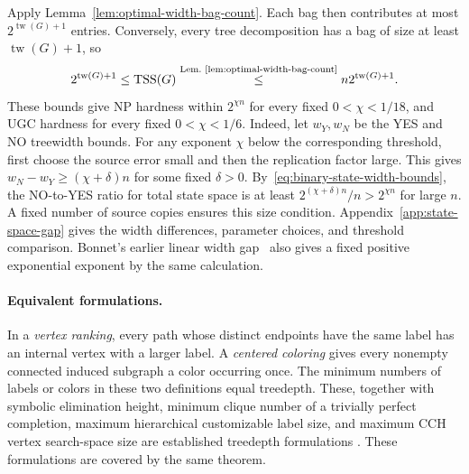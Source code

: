 Apply Lemma~\ref{lem:optimal-width-bag-count}.
Each bag then contributes at most $2^{\operatorname{tw}(G)+1}$ entries.
Conversely, every tree decomposition has a bag of size at least
$\operatorname{tw}(G)+1$, so
\begin{equation}\label{eq:binary-state-width-bounds}
 2^{\operatorname{tw}(G)+1}\leq\operatorname{TSS}(G)
       \overset{\text{Lem.~\ref{lem:optimal-width-bag-count}}}{\leq}n2^{\operatorname{tw}(G)+1}.
\end{equation}
These bounds give
NP hardness within $2^{\chi n}$ for every fixed $0<\chi<1/18$,
and UGC hardness for every fixed $0<\chi<1/6$.
Indeed, let $w_Y,w_N$ be the YES and NO treewidth bounds.
For any exponent $\chi$ below the corresponding threshold, first
choose the source error small and then the replication factor large.
This gives $w_N-w_Y\ge(\chi+\delta)n$ for some fixed $\delta>0$.
By~\eqref{eq:binary-state-width-bounds}, the NO-to-YES ratio for total
state space is at least $2^{(\chi+\delta)n}/n>2^{\chi n}$ for large
$n$. A fixed number of source copies ensures this size condition.
Appendix~\ref{app:state-space-gap} gives the width differences,
parameter choices, and threshold comparison.
Bonnet's earlier linear width gap~\cite{BonnetTreewidth} also gives
a fixed positive exponential exponent by the same calculation.

\paragraph{Equivalent formulations.}
In a \emph{vertex ranking}, every path whose distinct endpoints
have the same label has an internal vertex with a larger label.
A \emph{centered coloring} gives every nonempty connected induced
subgraph a color occurring once. The minimum numbers of
labels or colors in these two definitions equal treedepth.
These, together with symbolic elimination height,
minimum clique number of a trivially perfect completion, maximum
hierarchical customizable label size, and maximum CCH vertex
search-space size are established treedepth formulations
\cite{Reidl2014,BodlaenderRankings,BlumStorandt2023}. These formulations
are covered by the same theorem.
